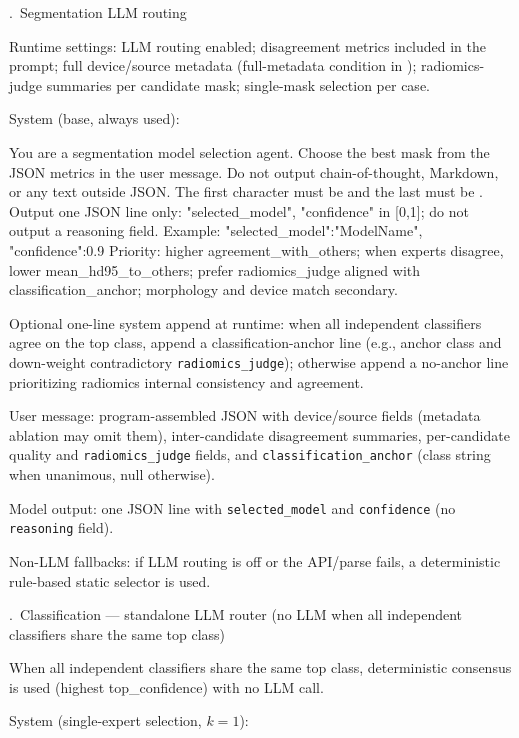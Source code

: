 \begin{responseappendixprose}
.~Segmentation LLM routing
\par
Runtime settings: LLM routing enabled; disagreement metrics included in the prompt; full device/source metadata (full-metadata condition in ); radiomics-judge summaries per candidate mask; single-mask selection per case.\par
System (base, always used):\par
\begin{promptverbatim}
You are a segmentation model selection agent. Choose the best mask from the JSON metrics in the user message.
Do not output chain-of-thought, Markdown, or any text outside JSON. The first character must be { and the last must be }.
Output one JSON line only: "selected_model", "confidence" in [0,1]; do not output a reasoning field. Example: {"selected_model":"ModelName", "confidence":0.9}
Priority: higher agreement_with_others; when experts disagree, lower mean_hd95_to_others; prefer radiomics_judge aligned with classification_anchor; morphology and device match secondary.
\end{promptverbatim}
Optional one-line system append at runtime: when all independent classifiers agree on the top class, append a classification-anchor line (e.g., anchor class and down-weight contradictory \texttt{radiomics\_judge}); otherwise append a no-anchor line prioritizing radiomics internal consistency and agreement.\par
User message: program-assembled JSON with device/source fields (metadata ablation may omit them), inter-candidate disagreement summaries, per-candidate quality and \texttt{radiomics\_judge} fields, and \texttt{classification\_anchor} (class string when unanimous, null otherwise).\par
Model output: one JSON line with \texttt{selected\_model} and \texttt{confidence} (no \texttt{reasoning} field).\par
Non-LLM fallbacks: if LLM routing is off or the API/parse fails, a deterministic rule-based static selector is used.\par
{}.~Classification --- standalone LLM router (no LLM when all independent classifiers share the same top class)
\par
When all independent classifiers share the same top class, deterministic consensus is used (highest top\_confidence) with no LLM call.\par
System (single-expert selection, $k{=}1$):\par

\end{responseappendixprose}
